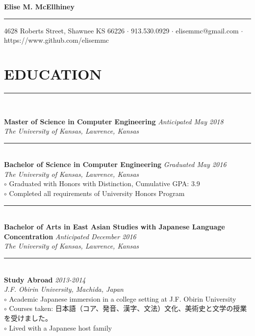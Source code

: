 \documentclass[twoside]{article}
\begin{document}
\begingroup
	\fontsize{20pt}{12pt}\selectfont
	\textbf{Elise M. McEllhiney}\\
\endgroup
\rule{\textwidth}{1.5pt}
\begin{center}
\vspace{-0.6em}
\small{4628 Roberts Street, Shawnee KS 66226 $\cdot$ 913.530.0929 $\cdot$ elisemmc@gmail.com $\cdot$ https://www.github.com/elisemmc}
\end{center}

\fontsize{9pt}{11pt}\selectfont

\section*{EDUCATION}
\vspace{-1em}
\rule{\textwidth}{1pt}\\
\begin{adjustwidth}{0.2in}{0in}
\vspace{-1em}
\textbf{Master of Science in Computer Engineering} \hfill \textit{Anticipated May 2018}\\
\textit{The University of Kansas, Lawrence, Kansas}\\
\rule{7.3in}{0.5pt}\\
\textbf{Bachelor of Science in Computer Engineering} \hfill \textit{Graduated May 2016}\\
\textit{The University of Kansas, Lawrence, Kansas}\\
$\circ$ Graduated with Honors with Distinction, Cumulative GPA: 3.9\\
$\circ$ Completed all requirements of University Honors Program\\
\rule{7.3in}{0.5pt}\\
\textbf{Bachelor of Arts in East Asian Studies with Japanese Language Concentration} \hfill \textit{Anticipated December 2016}\\
\textit{The University of Kansas, Lawrence, Kansas}\\
\rule{7.3in}{0.5pt}\\
\textbf{Study Abroad} \hfill \textit{2013-2014}\\
\textit{J.F. Obirin University, Machida, Japan}\\
$\circ$ Academic Japanese immersion in a college setting at J.F. Obirin University\\
$\circ$ Courses taken: 日本語（コア、発音、漢字、文法）文化、美術史と文学の授業を受けました。\\
$\circ$ Lived with a Japanese host family\\
\end{adjustwidth}
\end{document}
